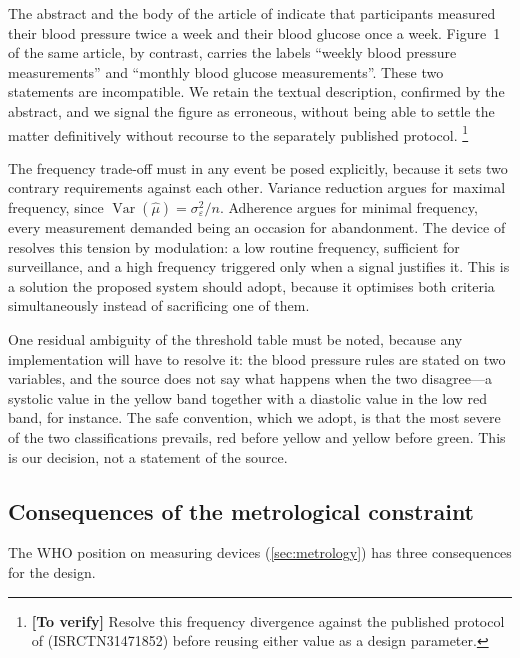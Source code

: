\documentclass[12pt,a4paper,oneside]{report}
\newcommand{\verify}[1]{\footnote{\textbf{[To verify]} #1}}
\begin{document}
The abstract and the body of the article of \textcite{mihevc2025} indicate that participants measured their blood pressure twice a week and their blood glucose once a week. Figure~1 of the same article, by contrast, carries the labels ``weekly blood pressure measurements'' and ``monthly blood glucose measurements''. These two statements are incompatible. We retain the textual description, confirmed by the abstract, and we signal the figure as erroneous, without being able to settle the matter definitively without recourse to the separately published protocol.%
\verify{Resolve this frequency divergence against the published protocol of \textcite{mihevc2025} (ISRCTN31471852) before reusing either value as a design parameter.}

The frequency trade-off must in any event be posed explicitly, because it sets two contrary requirements against each other. Variance reduction argues for maximal frequency, since $\operatorname{Var}(\hat\mu) = \sigma_\varepsilon^2 / n$. Adherence argues for minimal frequency, every measurement demanded being an occasion for abandonment. The device of \textcite{mihevc2025} resolves this tension by modulation: a low routine frequency, sufficient for surveillance, and a high frequency triggered only when a signal justifies it. This is a solution the proposed system should adopt, because it optimises both criteria simultaneously instead of sacrificing one of them.

One residual ambiguity of the threshold table must be noted, because any implementation will have to resolve it: the blood pressure rules are stated on two variables, and the source does not say what happens when the two disagree---a systolic value in the yellow band together with a diastolic value in the low red band, for instance. The safe convention, which we adopt, is that the most severe of the two classifications prevails, red before yellow and yellow before green. This is our decision, not a statement of the source.

\subsection{Consequences of the metrological constraint}\label{sec:metrology-consequences}

The WHO position on measuring devices (\cref{sec:metrology}) has three consequences for the design.
\end{document}

